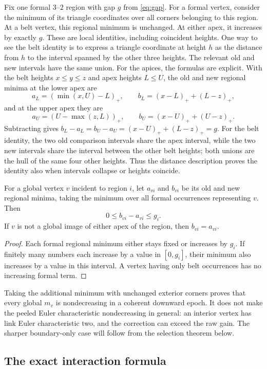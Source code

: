 Fix one formal $3$--$2$ region with gap $g$ from \eqref{eq:gap}.
For a formal vertex, consider the minimum of its triangle coordinates
over all corners belonging to this region. At a belt vertex, this
regional minimum is unchanged. At either apex, it increases by exactly
$g$. These are local identities, including coincident heights. One way
to see the belt identity is to express a triangle coordinate at height
$h$ as the distance from $h$ to the interval spanned by the other three
heights. The relevant old and new intervals have the same union. For
the apices, the formulas are explicit. With the belt heights
$x\le y\le z$ and apex heights $L\le U$, the old and new regional
minima at the lower apex are
\[
 a_L=(\min(x,U)-L)_+,\qquad
 b_L=(x-L)_+ +(L-z)_+,
\]
and at the upper apex they are
\[
 a_U=(U-\max(z,L))_+,\qquad
 b_U=(x-U)_+ +(U-z)_+.
\]
Subtracting gives $b_L-a_L=b_U-a_U=(x-U)_++(L-z)_+=g$.
For the belt identity, the two old comparison intervals share the
apex interval, while the two new intervals share the interval between
the other belt heights; both unions are the hull of the same four
other heights. Thus the distance description proves the identity also
when intervals collapse or heights coincide.

\begin{lemma}
\label{lem:regional-minima}
For a global vertex $v$ incident to region $i$, let $a_{vi}$ and
$b_{vi}$ be its old and new regional minima, taking the minimum over
all formal occurrences representing $v$. Then
\[
 0\le b_{vi}-a_{vi}\le g_i.
\]
If $v$ is not a global image of either apex of the region, then
$b_{vi}=a_{vi}$.
\end{lemma}
\begin{proof}
Each formal regional minimum either stays fixed or increases by
$g_i$. If finitely many numbers each increase by a value in $[0,g_i]$,
their minimum also increases by a value in this interval. A vertex
having only belt occurrences has no increasing formal term.
\end{proof}

Taking the additional minimum with unchanged exterior corners proves
that every global $m_v$ is nondecreasing in a coherent downward epoch.
It does not make the peeled Euler characteristic nondecreasing in
general: an interior vertex has link Euler characteristic two, and
the correction can exceed the raw gain. The sharper boundary-only
case will follow from the selection theorem below.

\subsection{The exact interaction formula}

